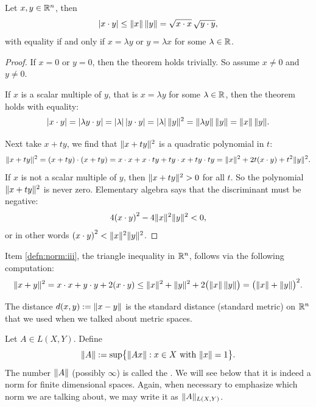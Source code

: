\begin{thm}
Let $x, y \in {\mathbb{R}}^n$, then
\begin{equation*}
\lvert {x \cdot y} \rvert \leq \lVert {x} \rVert \, \lVert {y} \rVert = \sqrt{x\cdot x}\, \sqrt{y\cdot y},
\end{equation*}
with equality if and only if $x = \lambda y$ or $y = \lambda x$ for some
$\lambda \in {\mathbb{R}}$.
\end{thm}

\begin{proof}
If $x=0$ or $y = 0$, then the theorem holds trivially.
So assume $x\not= 0$ and $y \not= 0$.

If $x$ is a scalar multiple of $y$, that is $x = \lambda y$ for some
$\lambda \in {\mathbb{R}}$, then the theorem holds with equality:
\begin{equation*}
\lvert { x \cdot y } \rvert =
\lvert {\lambda y \cdot y} \rvert = \lvert {\lambda} \rvert \, \lvert {y\cdot y} \rvert =
\lvert {\lambda} \rvert \, \lVert {y} \rVert^2 = \lVert {\lambda y} \rVert \, \lVert {y} \rVert
= \lVert {x} \rVert \, \lVert {y} \rVert .
\end{equation*}

Next take $x+ty$, we find that
$\lVert {x+ty} \rVert^2$ is a quadratic polynomial in $t$:
\begin{equation*}
\lVert {x+ty} \rVert^2 =
(x+ty) \cdot (x+ty) =
x \cdot x + x \cdot ty + ty \cdot x + ty \cdot ty
=
\lVert {x} \rVert^2 + 2t(x \cdot y) + t^2 \lVert {y} \rVert^2 .
\end{equation*}
If $x$ is not a scalar multiple of $y$, then 
$\lVert {x+ty} \rVert^2 > 0$ for all $t$.  So the polynomial $\lVert {x+ty} \rVert^2$
is never zero.
Elementary algebra says that the discriminant must be negative:
\begin{equation*}
4 {(x \cdot y)}^2 - 4 \lVert {x} \rVert^2\lVert {y} \rVert^2 < 0,
\end{equation*}
or in other words ${(x \cdot y)}^2 < \lVert {x} \rVert^2\lVert {y} \rVert^2$.
\end{proof}

Item \ref{defn:norm:iii}, the triangle inequality in ${\mathbb{R}}^n$,
follows via the following computation:
\begin{equation*}
\lVert {x+y} \rVert^2 
=
x \cdot x + y \cdot y + 2 (x \cdot y)
\leq
\lVert {x} \rVert^2 + \lVert {y} \rVert^2 + 2 \bigl(\lVert {x} \rVert \,\lVert {y} \rVert\bigr)
=
{\bigl(\lVert {x} \rVert + \lVert {y} \rVert\bigr)}^2 .
\end{equation*}

The distance
$d(x,y) := \lVert {x-y} \rVert$ is the standard
distance (standard metric) on ${\mathbb{R}}^n$ that
we used when we talked about metric spaces.

\begin{defn}
Let $A \in L(X,Y)$.  Define
\begin{equation*}
\lVert {A} \rVert :=
\sup \bigl\{ \lVert {Ax} \rVert : x \in X \text{ with } \lVert {x} \rVert = 1 \bigr\} .
\end{equation*}
The number $\lVert {A} \rVert$ (possibly $\infty$)
is called the \emph{}.  We will see below
that it is indeed a norm for finite dimensional spaces.
Again, when necessary to emphasize which norm we are talking about, we may
write it as $\lVert {A} \rVert_{L(X,Y)}$.
\end{defn}

